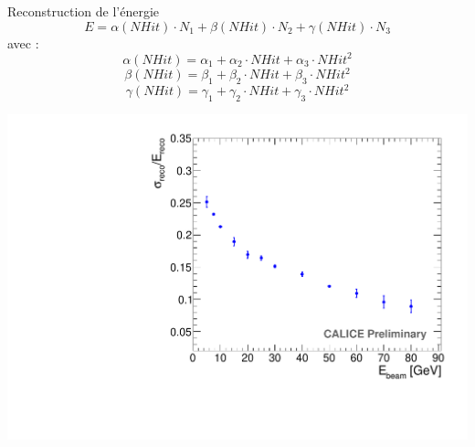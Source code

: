 \documentclass[8pt]{beamer}
\begin{document}
  
  \begin{frame}
  \frametitle{\secname}
  \framesubtitle{\subsecname}
    \begin{minipage}{0.48\linewidth}
      \begin{block}{Reconstruction de l'énergie}
        {\small
        \begin{equation}
          E = \alpha(NHit)\cdot N_1 + \beta(NHit)\cdot N_2 + \gamma(NHit)\cdot N_3 
        \end{equation}
        avec :
        \begin{equation}
          \alpha(NHit) = \alpha_1 + \alpha_2\cdot NHit + \alpha_3\cdot NHit^2
        \end{equation}
        \begin{equation}
          \beta(NHit) = \beta_1 + \beta_2\cdot NHit + \beta_3\cdot NHit^2
        \end{equation}
        \begin{equation}
          \gamma(NHit) = \gamma_1 + \gamma_2\cdot NHit + \gamma_3\cdot NHit^2
        \end{equation}
        }
      \end{block}
      \includegraphics[width=\linewidth]{Energy-Resolution.pdf}
    \end{minipage} \hfill
    \begin{minipage}{0.5\linewidth}
      \begin{center}

\end{center}
\end{minipage}
\end{frame}
\end{document}
